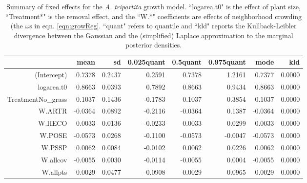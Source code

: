 \documentclass[11pt]{article}
\begin{document}
\begin{table}[ht]
\centering
\caption{Summary of fixed effects for the \textit{A. tripartita} growth model. ``logarea.t0" is the effect of plant size, ``Treatment*" is the removal effect, and the ``W.*" coefficients 
are effects of neighborhood crowding (the $\omega$s in eqn. \ref{eqn:growReg}. ``quant" refers to quantile and ``kld" reports the Kullback-Leibler divergence between the Gaussian and the (simplified) Laplace approximation to the marginal posterior densities.} 
\label{ARTRgrowth}
\begin{tabular}{rrrrrrrr}
  \hline
 & mean & sd & 0.025quant & 0.5quant & 0.975quant & mode & kld \\ 
  \hline
(Intercept) & 0.7378 & 0.2437 & 0.2591 & 0.7378 & 1.2161 & 0.7377 & 0.0000 \\ 
  logarea.t0 & 0.8663 & 0.0393 & 0.7892 & 0.8663 & 0.9434 & 0.8663 & 0.0000 \\ 
  TreatmentNo\_grass & 0.1037 & 0.1436 & -0.1783 & 0.1037 & 0.3854 & 0.1037 & 0.0000 \\ 
  W.ARTR & -0.0364 & 0.0892 & -0.2116 & -0.0364 & 0.1387 & -0.0364 & 0.0000 \\ 
  W.HECO & 0.0033 & 0.0136 & -0.0233 & 0.0033 & 0.0299 & 0.0033 & 0.0000 \\ 
  W.POSE & -0.0573 & 0.0268 & -0.1100 & -0.0573 & -0.0047 & -0.0573 & 0.0000 \\ 
  W.PSSP & 0.0062 & 0.0084 & -0.0102 & 0.0062 & 0.0226 & 0.0062 & 0.0000 \\ 
  W.allcov & -0.0055 & 0.0030 & -0.0114 & -0.0055 & 0.0004 & -0.0055 & 0.0000 \\ 
  W.allpts & 0.0029 & 0.0477 & -0.0908 & 0.0029 & 0.0965 & 0.0029 & 0.0000 \\ 
   \hline
\end{tabular}
\end{table}
\end{document}
